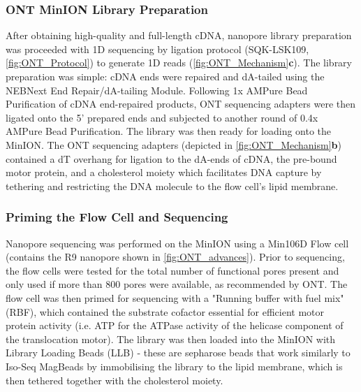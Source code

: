 \subsubsection{ONT MinION Library Preparation}
\label{sec: ONTlib_preparation}
After obtaining high-quality and full-length cDNA, nanopore library preparation was proceeded with 1D sequencing by ligation protocol (SQK-LSK109, \cref{fig:ONT_Protocol}) to generate 1D reads (\cref{fig:ONT_Mechanism}\textbf{c}). The library preparation was simple: cDNA ends were repaired and dA-tailed using the NEBNext End Repair/dA-tailing Module. Following 1x AMPure Bead Purification of cDNA end-repaired products, ONT sequencing adapters were then ligated onto the 5' prepared ends and subjected to another round of 0.4x AMPure Bead Purification. The library was then ready for loading onto the MinION. The ONT sequencing adapters (depicted in \cref{fig:ONT_Mechanism}\textbf{b}) contained a dT overhang for ligation to the dA-ends of cDNA, the pre-bound motor protein, and a cholesterol moiety which facilitates DNA capture by tethering and restricting the DNA molecule to the flow cell's lipid membrane.

\subsubsection{Priming the Flow Cell and Sequencing}
Nanopore sequencing was performed on the MinION using a Min106D Flow cell (contains the R9 nanopore shown in \cref{fig:ONT_advances}). Prior to sequencing, the flow cells were tested for the total number of functional pores present and only used if more than 800 pores were available, as recommended by ONT. The flow cell was then primed for sequencing with a "Running buffer with fuel mix" (RBF), which contained the substrate cofactor essential for efficient motor protein activity (i.e. ATP for the ATPase activity of the helicase component of the translocation motor). The library was then loaded into the MinION with Library Loading Beads (LLB) - these are sepharose beads that work similarly to Iso-Seq MagBeads by immobilising the library to the lipid membrane, which is then tethered together with the cholesterol moiety.    


